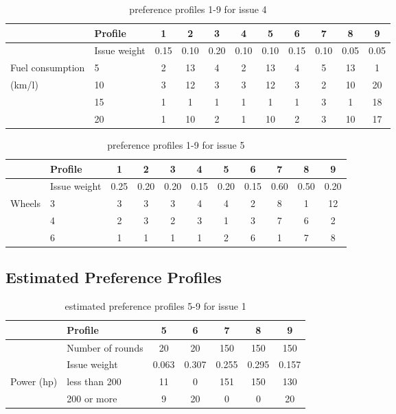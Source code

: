 \begin{table}[H]
\centering
\caption{preference profiles 1-9 for issue 4}
\label{tab:issue4}
\begin{tabular}{|p{3cm}|p{3cm}||c|c|c||c|c|c||c|c|c|}
\hline
&Profile & 1 & 2 & 3 & 4 & 5 & 6 & 7 & 8 & 9 \\
\hline
&Issue weight& 0.15 & 0.10 & 0.20 & 0.10 & 0.10 & 0.15 & 0.10 & 0.05 & 0.05 \\
\hline
\hline
Fuel consumption &5   & 2 & 13 &4 &2 &13 &4 &5 &13 &1  \\
(km/l)           &10  & 3 & 12 &3 &3 &12 &3 &2 &10 &20 \\
                 &15  & 1 & 1  &1 &1 &1  &1 &3 &1  &18 \\
                 &20  & 1 & 10 &2 &1 &10 &2 &3 &10 &17 \\
\hline
\end{tabular}
\end{table}



\begin{table}[H]
\centering
\caption{preference profiles 1-9 for issue 5}
\label{tab:issue5}
\begin{tabular}{|p{3cm}|p{3cm}||c|c|c||c|c|c||c|c|c|}
\hline
&Profile & 1 & 2 & 3 & 4 & 5 & 6 & 7 & 8 & 9 \\
\hline
&Issue weight& 0.25 & 0.20 & 0.20 & 0.15 & 0.20 & 0.15 & 0.60 & 0.50 & 0.20 \\
\hline
\hline
Wheels &3   & 3 & 3 &3 &4 &4 &2 &8 &1 &12 \\
       &4   & 2 & 3 &2 &3 &1 &3 &7 &6 &2 \\
       &6   & 1 & 1 &1 &1 &2 &6 &1 &7 &8 \\
\hline
\end{tabular}
\end{table}

\newpage

\subsection{Estimated Preference Profiles}
\label{sec:attached_estimated_preference_profiles}

\begin{table}[H]
\centering
\caption{estimated preference profiles 5-9 for issue 1}
\label{tab:issue1estimation}
\begin{tabular}{|p{3cm}|p{3cm}||c|c||c|c|c|}
\hline
&Profile & 5 & 6 & 7 & 8 & 9 \\
\hline
&Number of rounds & 20 & 20 & 150 & 150 & 150 \\
\hline
&Issue weight& 0.063 & 0.307 & 0.255 & 0.295 & 0.157 \\
\hline
\hline
Power (hp)
&less than 200 & 11 & 0  & 151 & 150 & 130 \\
&200 or more   & 9  & 20 & 0   & 0   & 20 \\
\hline
\end{tabular}
\end{table}





